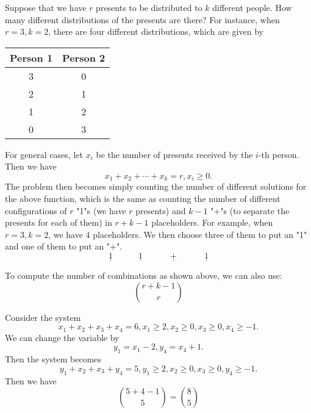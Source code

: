 \begin{eg}
    Suppose that we have \(r\) presents to be distributed to \(k\) different people. How many different distributions of the presents are there? For instance, when \(r = 3, k = 2\), there are four different distributions, which are given by
    \begin{table}[H]
        \centering
        \begin{tabular}{c|c}
                Person 1 & Person 2  \\
            \midrule
                3 & 0  \\
                2 & 1  \\
                1 & 2  \\
                0 & 3  \\
        \end{tabular}
    \end{table}
    For general cases, let \(x_i\) be the number of presents received by the \(i\)-th person. Then we have
    \[
        x_1 + x_2 + \cdots + x_k = r, x_i \geq 0.
    \]
    The problem then becomes simply counting the number of different solutions for the above function, which is the same as counting the number of different configurations of \(r\) "1"s (we have \(r\) presents) and \(k-1\) "+"s (to separate the presents for each of them) in \(r + k - 1\) placeholders. For example, when \(r = 3, k = 2\), we have 4 placeholders. We then choose three of them to put an "1" and one of them to put an "+".
    \[
        \underline{\quad1\quad}\quad\underline{\quad1\quad}\quad\underline{\quad+\quad}\quad\underline{\quad1\quad}
    \]
\end{eg}
To compute the number of combinations as shown above, we can also use:
\[
    \binom{r + k - 1}{r}
\]
\begin{eg}
    Consider the system
    \[
        x_1 + x_2 + x_3 + x_4 = 6, x_1 \geq 2, x_2 \geq 0, x_3 \geq 0, x_4 \geq -1.
    \]
    We can change the variable by 
    \[
        y_1 = x_1 - 2, y_4 = x_4 + 1. 
    \]
    Then the system becomes
    \[
        y_1 + x_2 + x_3 + y_4 = 5, y_1 \geq 2, x_2 \geq 0, x_3 \geq 0, y_4 \geq -1.
    \]
    Then we have
    \[
        \binom{5 + 4 - 1}{5} = \binom{8}{5}
    \]
\end{eg}

